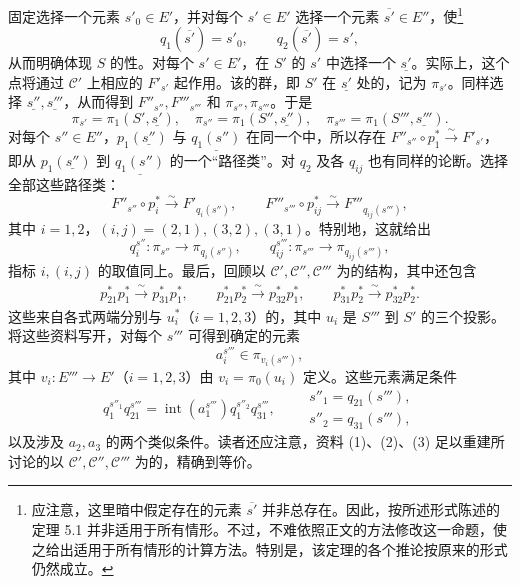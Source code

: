 固定选择一个元素 $s'_0\in E'$，并对每个 $s'\in E'$ 选择一个元素 $\overline{s'}\in E''$，使\footnote{应注意，这里暗中假定存在的元素 $\overline{s'}$ 并非总存在。因此，按所述形式陈述的定理 5.1 并非适用于所有情形。不过，不难依照正文的方法修改这一命题，使之给出适用于所有情形的计算方法。特别是，该定理的各个推论按原来的形式仍然成立。}
\[
q_1(\overline{s'})=s'_0,\qquad q_2(\overline{s'})=s',
\]
从而明确体现 $S$ 的性。对每个 $s'\in E'$，在 $S'$ 的 $s'$ 中选择一个 $\underline{s'}$。实际上，这个点将通过 $\mathcal C'$ 上相应的 $F'_{s'}$ 起作用。该的群，即 $S'$ 在 $\underline{s'}$ 处的，记为 $\pi_{s'}$。同样选择 $\underline{s''},\underline{s'''}$，从而得到 $F''_{s''},F'''_{s'''}$ 和 $\pi_{s''},\pi_{s'''}$。于是
\[
\pi_{s'}=\pi_1(S',\underline{s'}),\quad
\pi_{s''}=\pi_1(S'',\underline{s''}),\quad
\pi_{s'''}=\pi_1(S''',\underline{s'''}).
\]
对每个 $s''\in E''$，$p_1(\underline{s''})$ 与 $\underline{q_1(s'')}$ 在同一个中，所以存在 $F''_{s''}\circ p_1^*\xrightarrow{\sim}F'_{s'}$，即从 $p_1(\underline{s''})$ 到 $\underline{q_1(s'')}$ 的一个“路径类”。对 $q_2$ 及各 $q_{ij}$ 也有同样的论断。选择全部这些路径类：
\[
F''_{s''}\circ p_i^*\xrightarrow{\sim}F'_{q_i(s'')},\qquad
F'''_{s'''}\circ p_{ij}^*\xrightarrow{\sim}F'''_{q_{ij}(s''')},
\]
其中 $i=1,2$，$(i,j)=(2,1),(3,2),(3,1)$。特别地，这就给出
\[
q_i^{s''}:\pi_{s''}\longrightarrow\pi_{q_i(s'')},\qquad
q_{ij}^{s'''}:\pi_{s'''}\longrightarrow\pi_{q_{ij}(s''')},\tag{2}
\]
指标 $i,(i,j)$ 的取值同上。最后，回顾以 $\mathcal C',\mathcal C'',\mathcal C'''$ 为的结构，其中还包含
\[
\begin{gathered}
p_{21}^*p_1^*\xrightarrow{\sim}p_{31}^*p_1^*,\qquad
p_{21}^*p_2^*\xrightarrow{\sim}p_{32}^*p_1^*,\qquad
p_{31}^*p_2^*\xrightarrow{\sim}p_{32}^*p_2^*.
\end{gathered}
\]
这些来自各式两端分别与 $u_i^*$（$i=1,2,3$）的，其中 $u_i$ 是 $S'''$ 到 $S'$ 的三个投影。将这些资料写开，对每个 $s'''$ 可得到确定的元素
\[
a_i^{s'''}\in\pi_{v_i(s''')},\tag{3}
\]
其中 $v_i:E'''\to E'$（$i=1,2,3$）由 $v_i=\pi_0(u_i)$ 定义。这些元素满足条件
\[
q_1^{s''_1}q_{21}^{s'''}
=\operatorname{int}(a_1^{s'''})q_1^{s''_2}q_{31}^{s'''},
\qquad
\begin{gathered}s''_1=q_{21}(s'''),\\s''_2=q_{31}(s'''),\end{gathered}
\]
以及涉及 $a_2,a_3$ 的两个类似条件。读者还应注意，资料 (1)、(2)、(3) 足以重建所讨论的以 $\mathcal C',\mathcal C'',\mathcal C'''$ 为的，精确到等价。

